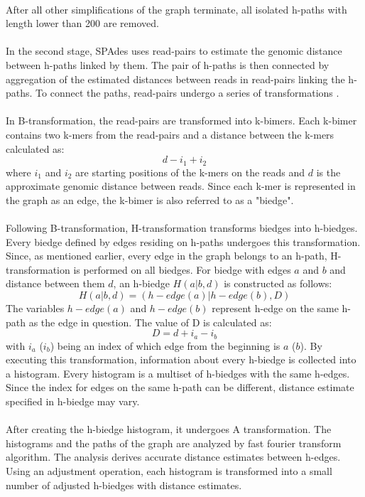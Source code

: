 \paragraph*{}
After all other simplifications of the graph terminate, all isolated h-paths with length lower than 200 are removed.
\paragraph*{}
In the second stage, SPAdes uses read-pairs to estimate the genomic distance between h-paths linked by them. The pair of h-paths is then connected by aggregation of the estimated distances between reads in read-pairs linking the h-paths. To connect the paths, read-pairs undergo a series of transformations \cite{bankevich2012spades}. 
\paragraph*{}
In B-transformation, the read-pairs are transformed into k-bimers. Each k-bimer contains two k-mers from the read-pairs and a distance between the k-mers calculated as:
\[d - i_{1} + i_{2}\]
where $i_{1}$ and $i_{2}$ are starting positions of the k-mers on the reads and $d$ is the approximate genomic distance between reads. Since each k-mer is represented in the graph as an edge, the k-bimer is also referred to as a "biedge".
\paragraph*{}
Following B-transformation, H-transformation transforms biedges into h-biedges. Every biedge defined by edges residing on h-paths undergoes this transformation. Since, as mentioned earlier, every edge in the graph belongs to an h-path, H-transformation is performed on all biedges. For biedge with edges $a$ and $b$ and distance between them $d$, an h-biedge $H(a|b,d)$ is constructed as follows:
\[ H(a|b,d) = (h-edge(a)|h-edge(b),D) \]
The variables $h-edge(a)$ and $h-edge(b)$ represent h-edge on the same h-path as the edge in question. The value of D is calculated as:
\[D = d + i_{a} - i_{b}\]
with $i_{a}$ ($i_{b}$) being an index of which edge from the beginning is $a$ ($b$). By executing this transformation, information about every h-biedge is collected into a histogram. Every histogram is a multiset of h-biedges with the same h-edges. Since the index for edges on the same h-path can be different, distance estimate specified in h-biedge may vary.
\paragraph*{}
After creating the h-biedge histogram, it undergoes A transformation. The histograms and the paths of the graph are analyzed by fast fourier transform algorithm. The analysis derives accurate distance estimates between h-edges. Using an adjustment operation, each histogram is transformed into a small number of adjusted h-biedges with distance estimates.
